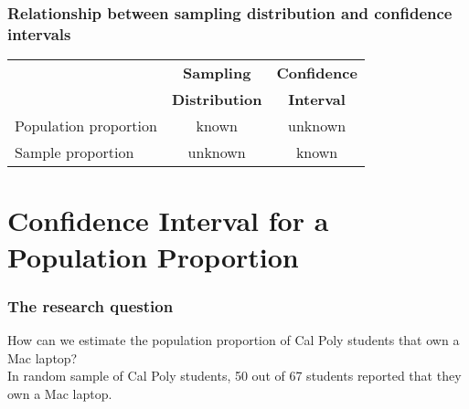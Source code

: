 \begin{frame}
\frametitle{Relationship between sampling distribution and confidence intervals}
{\renewcommand{\arraystretch}{1.3}
\begin{tabular}{lcc}
\hline
                      & \textbf{Sampling} & \textbf{Confidence} \\
                      & \textbf{Distribution} & \textbf{Interval} \\
\hline
Population proportion & known                 & unknown \\
Sample proportion     & unknown               & known \\
\hline
\end{tabular}}
\end{frame}

\section[CI for $p$]{Confidence Interval for a Population Proportion}
\begin{frame}
\end{frame}



\begin{frame}
\frametitle{The research question}
How can we estimate the population proportion of Cal Poly students that own a Mac laptop?\\
\vskip10pt
In random sample of Cal Poly students,  50 out of 67 students reported that they own a Mac laptop.
\vskip100pt
\end{frame}




